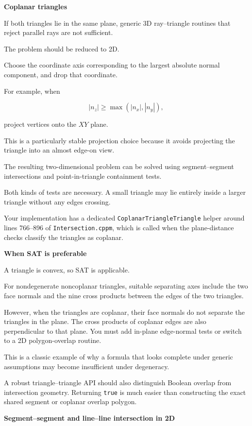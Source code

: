 \textbf{Coplanar triangles}

If both triangles lie in the same plane, generic 3D ray--triangle routines that reject parallel rays are not sufficient.

The problem should be reduced to 2D.

Choose the coordinate axis corresponding to the largest absolute normal component, and drop that coordinate.

For example, when

\[
|n_z|\ge\max(|n_x|,|n_y|),
\]

project vertices onto the \(XY\) plane.

This is a particularly stable projection choice because it avoids projecting the triangle into an almost edge-on view.

The resulting two-dimensional problem can be solved using segment--segment intersections and point-in-triangle containment tests.

Both kinds of tests are necessary. A small triangle may lie entirely inside a larger triangle without any edges crossing.

Your implementation has a dedicated \texttt{CoplanarTriangleTriangle} helper around lines 766--896 of \texttt{Intersection.cppm}, which is called when the plane-distance checks classify the triangles as coplanar.

\textbf{When SAT is preferable}

A triangle is convex, so SAT is applicable.

For nondegenerate noncoplanar triangles, suitable separating axes include the two face normals and the nine cross products between the edges of the two triangles.

However, when the triangles are coplanar, their face normals do not separate the triangles in the plane. The cross products of coplanar edges are also perpendicular to that plane. You must add in-plane edge-normal tests or switch to a 2D polygon-overlap routine.

This is a classic example of why a formula that looks complete under generic assumptions may become insufficient under degeneracy.

A robust triangle--triangle API should also distinguish Boolean overlap from intersection geometry. Returning \texttt{true} is much easier than constructing the exact shared segment or coplanar overlap polygon.

\textbf{Segment--segment and line--line intersection in 2D}

